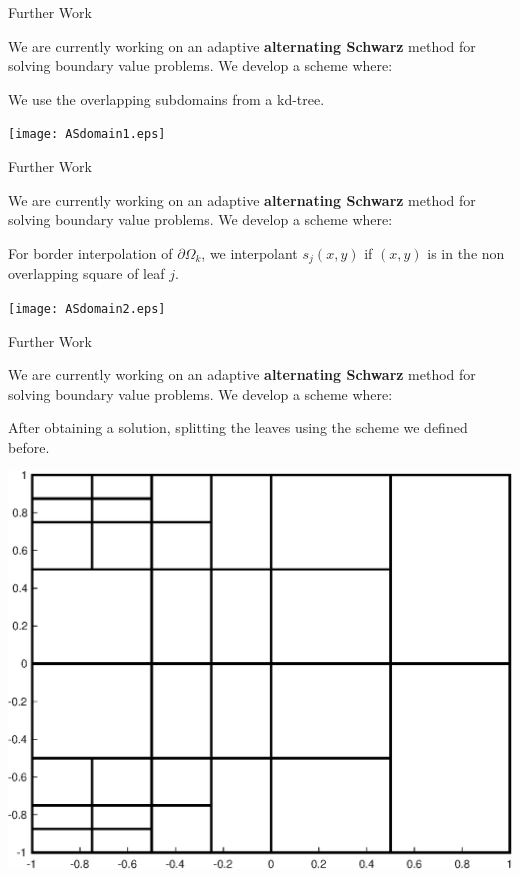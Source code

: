 \documentclass{beamer}
\begin{document}
\begin{frame}{Further Work}
	\begin{center}
		We are currently working on an adaptive \textbf{alternating Schwarz} method for solving boundary value problems. We develop a scheme where:
	\end{center}
	\begin{center}
		We use the overlapping subdomains from a kd-tree.
	\end{center}

	\begin{center}
		\texttt{[image: ASdomain1.eps]}
	\end{center}
\end{frame}

\begin{frame}{Further Work}
	\begin{center}
		We are currently working on an adaptive \textbf{alternating Schwarz} method for solving boundary value problems. We develop a scheme where:
	\end{center}
	\begin{center}
		For border interpolation of $\partial \Omega_k$, we interpolant $s_j(x,y)$ if $(x,y)$ is in the non overlapping square of leaf $j$.
	\end{center}

	\begin{center}
		\texttt{[image: ASdomain2.eps]}
	\end{center}
\end{frame}

\begin{frame}{Further Work}
	\begin{center}
		We are currently working on an adaptive \textbf{alternating Schwarz} method for solving boundary value problems. We develop a scheme where:
	\end{center}
	\begin{center}
		After obtaining a solution, splitting the leaves using the scheme we defined before.
	\end{center}

	\begin{center}
		\includegraphics[scale = 0.3]{zonePlot2.eps}
	\end{center}
\end{frame}
\end{document}
